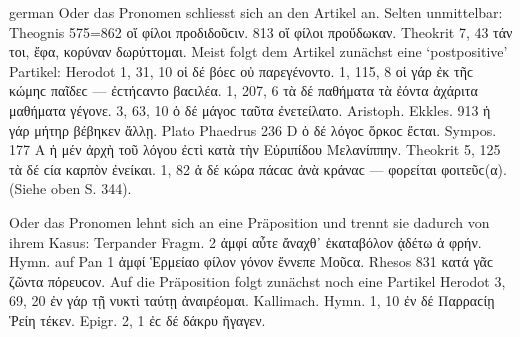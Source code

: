 \begin{otherlanguage*}{german}
Oder das Pronomen schliesst sich an den Artikel an. Selten unmittelbar: The\-ognis 575=862 οἵ  φίλοι προδιδοῦϲιν. 813 οἵ  φίλοι προὔδωκαν. Theokrit 7, 43 τάν τοι, ἔφα, κορύναν δωρύττομαι. Meist folgt dem Artikel zunächst eine ‘postpositive’ Partikel: Herodot 1, 31, 10 οἱ δέ  βόεϲ οὐ παρεγένοντο. 1, 115, 8 οἱ γάρ  ἐκ τῆϲ κώμηϲ παῖδεϲ — ἐϲτήϲαντο βαϲιλέα. 1, 207, 6 τὰ δέ  παθήματα τὰ ἐόντα ἀχάριτα μαθήματα γέγονε. 3, 63, 10 ὁ δέ  μάγοϲ ταῦτα ἐνετείλατο. Aristoph. Ekkles. 913 ἡ γάρ  μήτηρ βέβηκεν ἄλλῃ. Plato Phaedrus 236 D ὁ δέ  λόγοϲ ὅρκοϲ ἔϲται. Sympos. 177 Α ἡ μέν  ἀρχὴ τοῦ λόγου ἐϲτὶ κατὰ τὴν Εὐριπίδου Μελανίππην. Theokrit 5, 125 τὰ δέ  ϲία καρπὸν ἐνείκαι. 1, 82 ἁ δέ  κώρα πάϲαϲ ἀνὰ κράναϲ — φορείται φοιτεῦϲ(α). (Siehe oben S. 344).

Oder das Pronomen lehnt sich an eine Präposition und trennt sie dadurch von ihrem Kasus: Terpander Fragm. 2 ἀμφί  αὖτε ἄναχθ᾽ ἑκαταβόλον ᾀδέτω ἁ φρήν. Hymn. auf Pan 1 ἀμφί  Ἑρμείαο φίλον γόνον ἔννεπε Μοῦϲα. Rhesos 831 κατά  γᾶϲ ζῶντα πόρευϲον. Auf die Präposition folgt zunächst noch eine Partikel Herodot 3, 69, 20 ἐν γάρ  τῇ νυκτὶ ταύτῃ ἀναιρέομαι. Kallimach. Hymn. 1, 10 ἐν δέ  Παρραϲίῃ Ῥείη τέκεν. Epigr. 2, 1 ἐϲ δέ  δάκρυ ἤγαγεν.


\end{otherlanguage*}
